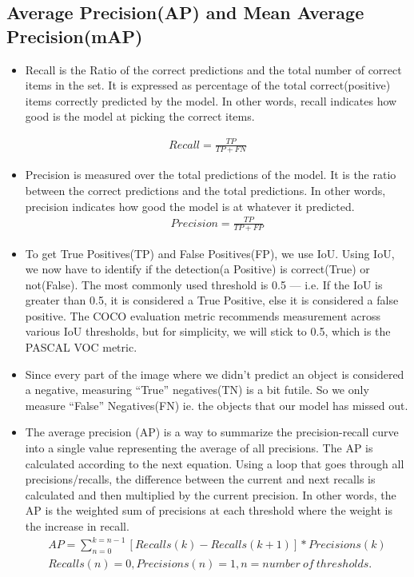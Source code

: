     \subsection{Average Precision(AP) and Mean Average Precision(mAP)}
        \begin{itemize}
            \item Recall is the Ratio of the correct predictions and the total number of correct items in the set. It is expressed as percentage of the total correct(positive) items correctly predicted by the model. In other words, recall indicates how good is the model at picking the correct items.
        \end{itemize}
        \begin{align}
            Recall = \frac{TP}{TP + FN}
        \end{align}
        \begin{itemize}
            \item Precision is measured over the total predictions of the model. It is the ratio between the correct predictions and the total predictions. In other words, precision indicates how good the model is at whatever it predicted.
                \begin{align}
                    Precision = \frac{TP}{TP + FP}
                \end{align}
            \item To get True Positives(TP) and False Positives(FP), we use IoU. Using IoU, we now have to identify if the detection(a Positive) is correct(True) or not(False). The most commonly used threshold is 0.5 — i.e. If the IoU is greater than 0.5, it is considered a True Positive, else it is considered a false positive. The COCO evaluation metric recommends measurement across various IoU thresholds, but for simplicity, we will stick to 0.5, which is the PASCAL VOC metric.
            \item Since every part of the image where we didn't predict an object is considered a negative, measuring “True” negatives(TN) is a bit futile. So we only measure “False” Negatives(FN) ie. the objects that our model has missed out.
            \item The average precision (AP) is a way to summarize the precision-recall curve into a single value representing the average of all precisions. The AP is calculated according to the next equation. Using a loop that goes through all precisions/recalls, the difference between the current and next recalls is calculated and then multiplied by the current precision. In other words, the AP is the weighted sum of precisions at each threshold where the weight is the increase in recall.
                \begin{align}
                    AP = \sum_{n=0}^{k=n-1} [Recalls(k) - Recalls(k + 1)] * Precisions(k) \\
                    Recalls(n) = 0, Precisions(n) = 1, n = number\:of\:thresholds.
                \end{align}
        \end{itemize}
